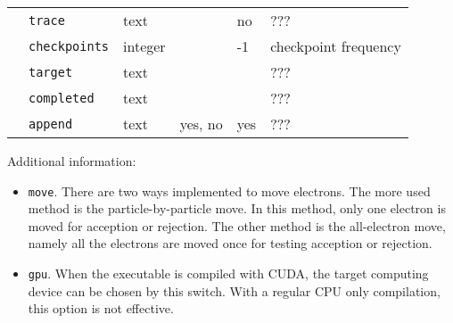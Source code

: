 \begin{table}[h]
\begin{center}
\begin{tabularx}{\textwidth}{l l l l l l }
   &   \texttt{trace}         &  text              &                  & no                & ???                      \\
   &   \texttt{checkpoints}   &  integer           &                  & -1                & checkpoint frequency \\
   &   \texttt{target}        &  text              &                  &                   & ???  \\
   &   \texttt{completed}     &  text              &                  &                   & ???  \\
   &   \texttt{append}        &  text              &   yes, no        & yes               & ???  \\
\hline

\end{tabularx}
\end{center}
\end{table}

Additional information:
\begin{itemize}
\item \texttt{move}. There are two ways implemented to move electrons. The more used method is the particle-by-particle move. In this method, only one electron is moved for acception or rejection. The other method is the all-electron move, namely all the electrons are moved once for testing acception or rejection.

\item \texttt{gpu}. When the executable is compiled with CUDA, the target computing device can be chosen by this switch. With a regular CPU only compilation, this option is not effective.

\end{itemize}
